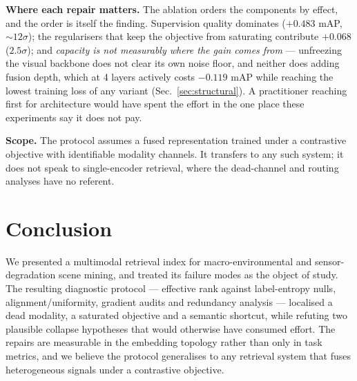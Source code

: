 \documentclass[10pt,twocolumn,letterpaper]{article}
\begin{document}
\noindent\textbf{Where each repair matters.} The ablation orders the
components by effect, and the order is itself the finding. Supervision
quality dominates ($+0.483$ mAP, ${\sim}12\sigma$); the regularisers that
keep the objective from saturating contribute $+0.068$ ($2.5\sigma$); and
\emph{capacity is not measurably where the gain comes from} --- unfreezing
the visual backbone does not clear its own noise floor, and neither does
adding fusion depth, which at 4 layers actively costs $-0.119$ mAP while
reaching the lowest training loss of any variant
(Sec.~\ref{sec:structural}). A practitioner reaching first for architecture
would have spent the effort in the one place these experiments say it does
not pay.

\noindent\textbf{Scope.} The protocol assumes a fused representation trained
under a contrastive objective with identifiable modality channels. It
transfers to any such system; it does not speak to single-encoder
retrieval, where the dead-channel and routing analyses have no referent.

\section{Conclusion}
We presented a multimodal retrieval index for macro-environmental and
sensor-degradation scene mining, and treated its failure modes as the
object of study. The resulting diagnostic protocol --- effective rank
against label-entropy nulls, alignment/uniformity, gradient audits and
redundancy analysis --- localised a dead modality, a saturated objective
and a semantic shortcut, while refuting two plausible collapse hypotheses
that would otherwise have consumed effort. The repairs are measurable in
the embedding topology rather than only in task metrics, and we believe
the protocol generalises to any retrieval system that fuses heterogeneous
signals under a contrastive objective.
\end{document}
